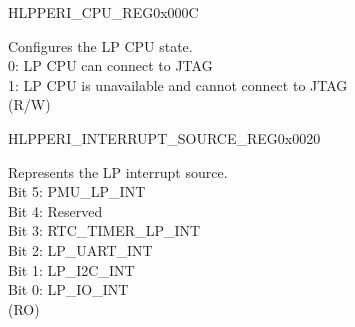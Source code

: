 \begin{register}{H}{LPPERI\_CPU\_REG}{0x000C}\label{regdesc:LPPERICPUREG}
%
%
\regnewline%
\begin{regdesc}\begin{reglist}
\label{fielddesc:LPPERILPCOREDBGMUNAVALIABLE}\item [LPPERI\_LPCORE\_DBGM\_UNAVALIABLE] Configures the LP CPU state.\\
0: LP CPU can connect to JTAG\\
1: LP CPU is unavailable and cannot connect to JTAG\\
(R/W)
\end{reglist}\end{regdesc}
\end{register}


\begin{register}{H}{LPPERI\_INTERRUPT\_SOURCE\_REG}{0x0020}\label{regdesc:LPPERIINTERRUPTSOURCEREG}
%
%
\regnewline%
\begin{regdesc}\begin{reglist}
\label{fielddesc:LPPERILPINTERRUPTSOURCE}\item [LPPERI\_LP\_INTERRUPT\_SOURCE] Represents the LP interrupt source.\\
Bit 5: PMU\_LP\_INT\\
Bit 4: Reserved\\
Bit 3: RTC\_TIMER\_LP\_INT\\
Bit 2: LP\_UART\_INT\\
Bit 1: LP\_I2C\_INT\\
Bit 0: LP\_IO\_INT\\
(RO)
\end{reglist}\end{regdesc}
\end{register}
